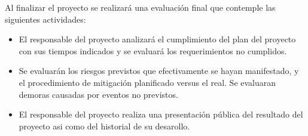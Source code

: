\documentclass[
11pt, %
]{charter}
\begin{document}


Al finalizar el proyecto se realizará una evaluación final que contemple las siguientes actividades:
\begin{itemize}


\item El responsable del proyecto analizará el cumplimiento del plan del proyecto con sus tiempos indicados y se evaluará los requerimientos no cumplidos.
\item Se evaluarán los riesgos previstos que efectivamente se hayan manifestado, y el procedimiento de mitigación planificado versus el real. Se evaluaran demoras causadas por eventos no previstos.
\item El responsable del proyecto realiza una presentación pública del resultado del proyecto asi como del historial de su desarollo.
\end{itemize}
\end{document}
